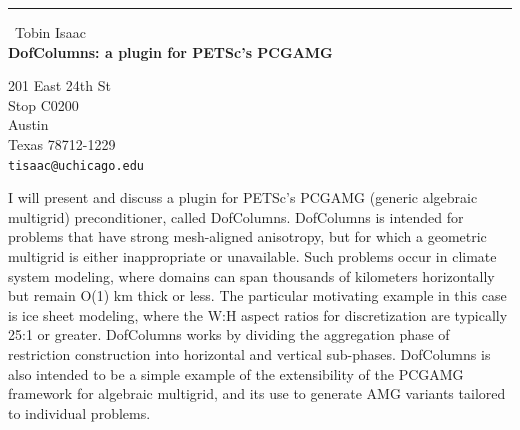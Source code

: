 \documentclass{report}
\begin{document}
\begin{center}
\rule{6in}{1pt} \
{\large Tobin Isaac \\
{\bf DofColumns: a plugin for PETSc's PCGAMG}}

201 East 24th St \\ Stop C0200 \\ Austin \\ Texas 78712-1229
\\
{\tt tisaac@uchicago.edu}\end{center}

I will present and discuss a plugin for PETSc's PCGAMG (generic algebraic
multigrid) preconditioner, called DofColumns. DofColumns is intended for
problems that have strong mesh-aligned anisotropy, but for which a
geometric multigrid is either inappropriate or unavailable. Such problems
occur in climate system modeling, where domains can span thousands of
kilometers horizontally but remain O(1) km thick or less. The particular
motivating example in this case is ice sheet modeling, where the W:H
aspect ratios for discretization are typically 25:1 or greater.
DofColumns works by dividing the aggregation phase of restriction
construction into horizontal and vertical sub-phases. DofColumns is also
intended to be a simple example of the extensibility of the PCGAMG
framework for algebraic multigrid, and its use to generate AMG variants
tailored to individual problems.
\end{document}
